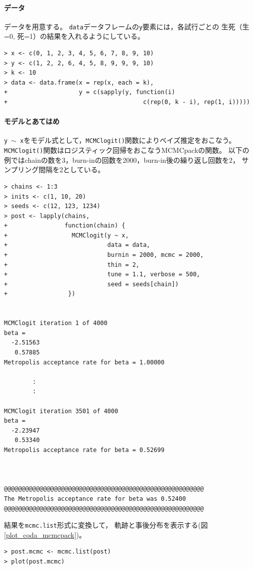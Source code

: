 \documentclass[11pt,uplatex]{jsarticle}
\begin{document}
\paragraph{データ}
データを用意する。
\texttt{data}データフレームの\texttt{y}要素には，各試行ごとの
生死（生=0, 死=1）の結果を入れるようにしている。
\begin{lstlisting}
> x <- c(0, 1, 2, 3, 4, 5, 6, 7, 8, 9, 10)
> y <- c(1, 2, 2, 6, 4, 5, 8, 9, 9, 9, 10)
> k <- 10
> data <- data.frame(x = rep(x, each = k),
+                    y = c(sapply(y, function(i)
+                                      c(rep(0, k - i), rep(1, i)))))
\end{lstlisting}

\paragraph{モデルとあてはめ}
\texttt{y $\sim$ x}をモデル式として，\texttt{MCMClogit()}関数によりベイズ推定をおこなう。
\texttt{MCMClogit()}関数はロジスティック回帰をおこなう\textsf{MCMCpack}の関数。
以下の例ではchainの数を3，burn-inの回数を2000，burn-in後の繰り返し回数を2，
サンプリング間隔を2としている。
\begin{lstlisting}
> chains <- 1:3
> inits <- c(1, 10, 20)
> seeds <- c(12, 123, 1234)
> post <- lapply(chains,
+                function(chain) {
+                  MCMClogit(y ~ x,
+                            data = data,
+                            burnin = 2000, mcmc = 2000,
+                            thin = 2,
+                            tune = 1.1, verbose = 500,
+                            seed = seeds[chain])
+                 })


MCMClogit iteration 1 of 4000 
beta = 
  -2.51563
   0.57885
Metropolis acceptance rate for beta = 1.00000

        :
        :
        
MCMClogit iteration 3501 of 4000 
beta = 
  -2.23947
   0.53340
Metropolis acceptance rate for beta = 0.52699



@@@@@@@@@@@@@@@@@@@@@@@@@@@@@@@@@@@@@@@@@@@@@@@@@@@@@@@@
The Metropolis acceptance rate for beta was 0.52400
@@@@@@@@@@@@@@@@@@@@@@@@@@@@@@@@@@@@@@@@@@@@@@@@@@@@@@@@
\end{lstlisting}

結果を\texttt{mcmc.list}形式に変換して，
軌跡と事後分布を表示する(図\ref{plot_coda_mcmcpack})。
\begin{lstlisting}
> post.mcmc <- mcmc.list(post)
> plot(post.mcmc)
\end{lstlisting}
\end{document}
